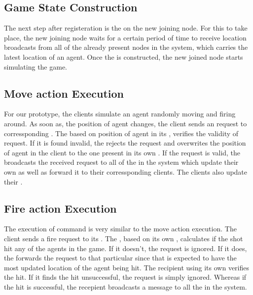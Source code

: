 \subsection{Game State Construction}
	The next step after registeration is the \gameStateConstruction on the new joining node. For this to take place, the new joining node waits for a certain period of time to receive location broadcasts from all of the already present nodes in the system, which carries  the latest location of an agent. Once the \gamestate is constructed, the new joined node starts simulating the game.	

\subsection{Move action Execution}
	For our prototype, the clients simulate an agent randomly moving and firing around. As soon as, the position of agent changes, the client sends an \move{\agent}{\position} request to corressponding \localServer. The \localServer based on position of agent in its \gamestate, verifies the validity of request. 
	If it is found invalid, the \localServer rejects the request and overwrites the position of agent in the client \gamestate to the one present in its own \gamestate.
	If the request is valid, the \localServer broadcasts the received request to all of the \localServers in the system which update their own \gamestate as well as forward it to their corressponding clients. The clients also update their \gamestates.

\subsection{Fire action Execution}
	The execution of  command is very similar to the move action execution. The client sends a fire request to its \localServer. The \localServer, based on its own \gamestate, calculates if the shot hit any of the agents in the game. If it doesn't, the request is ignored. If it does, the \localServer forwards the request to that particular \localServer since that \localServer is expected to have the most updated location of the agent being hit. The recipient \localServer using its own \gamestate verifies the hit. If it finds the hit unsuccessful, the request is simply ignored. Whereas if the hit is successful, the recepient \localServer broadcasts a  message to all the \localServers in the system.